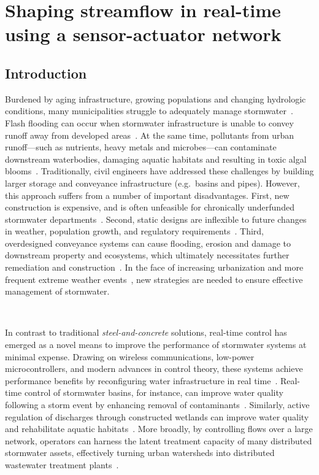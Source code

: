 \chapter{Shaping streamflow in real-time using a sensor-actuator network}\label{ch:shaping}
\vspace{1cm}

\section{Introduction}


Burdened by aging infrastructure, growing populations and changing hydrologic conditions, many municipalities struggle to adequately manage stormwater~\cite{kerkez2016}.
Flash flooding can occur when stormwater infrastructure is unable to convey runoff away from developed areas~\cite{Wright_2017}.
At the same time, pollutants from urban runoff---such as nutrients, heavy metals and microbes---can contaminate downstream waterbodies, damaging aquatic habitats and resulting in toxic algal blooms~\cite{kerkez2016}. Traditionally, civil engineers have addressed these challenges by building larger storage and conveyance infrastructure (e.g.\ basins and pipes). However, this approach suffers from a number of important disadvantages. First, new construction is expensive, and is often unfeasible for chronically underfunded stormwater departments~\cite{Montestruque_2015}. Second, static designs are inflexible to future changes in weather, population growth, and regulatory requirements~\cite{Wright_2017}. Third, overdesigned conveyance systems can cause flooding, erosion and damage to downstream property and ecosystems, which ultimately necessitates further remediation and construction~\cite{kerkez2016}. In the face of increasing urbanization and more frequent extreme weather events~\cite{Bronstert_2002, stocker_2014}, new strategies are needed to ensure effective management of stormwater.

\

In contrast to traditional \textit{steel-and-concrete} solutions, real-time control has emerged as a novel means to improve the performance of stormwater systems at minimal expense. Drawing on wireless communications, low-power microcontrollers, and modern advances in control theory, these systems achieve performance benefits by reconfiguring water infrastructure in real time~\cite{Bartos_2018, kerkez2016}. Real-time control of stormwater basins, for instance, can improve water quality following a storm event by enhancing removal of contaminants~\cite{kerkez2016}. Similarly, active regulation of discharges through constructed wetlands can improve water quality and rehabilitate aquatic habitats~\cite{Mullapudi_Wong_Kerkez_2017, Bartos_2018}. More broadly, by controlling flows over a large network, operators can harness the latent treatment capacity of many distributed stormwater assets, effectively turning urban watersheds into distributed wastewater treatment plants~\cite{Bartos_2018, kerkez2016}.


